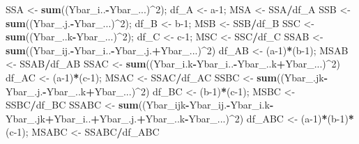 \documentclass[
]{book}
\newenvironment{Shaded}{\begin{snugshade}}{\end{snugshade}}
\newcommand{\DecValTok}[1]{\textcolor[rgb]{0.00,0.00,0.81}{#1}}
\newcommand{\FunctionTok}[1]{\textcolor[rgb]{0.13,0.29,0.53}{\textbf{#1}}}
\newcommand{\NormalTok}[1]{#1}
\newcommand{\OtherTok}[1]{\textcolor[rgb]{0.56,0.35,0.01}{#1}}
\newcommand{\SpecialCharTok}[1]{\textcolor[rgb]{0.81,0.36,0.00}{\textbf{#1}}}
\begin{document}
\begin{Shaded}
\begin{Highlighting}[]
\NormalTok{SSA }\OtherTok{\textless{}{-}} \FunctionTok{sum}\NormalTok{((Ybar\_i..}\SpecialCharTok{{-}}\NormalTok{Ybar\_...)}\SpecialCharTok{\^{}}\DecValTok{2}\NormalTok{); df\_A }\OtherTok{\textless{}{-}}\NormalTok{ a}\DecValTok{{-}1}\NormalTok{; MSA }\OtherTok{\textless{}{-}}\NormalTok{ SSA}\SpecialCharTok{/}\NormalTok{df\_A}
\NormalTok{SSB }\OtherTok{\textless{}{-}} \FunctionTok{sum}\NormalTok{((Ybar\_.j.}\SpecialCharTok{{-}}\NormalTok{Ybar\_...)}\SpecialCharTok{\^{}}\DecValTok{2}\NormalTok{); df\_B }\OtherTok{\textless{}{-}}\NormalTok{ b}\DecValTok{{-}1}\NormalTok{; MSB }\OtherTok{\textless{}{-}}\NormalTok{ SSB}\SpecialCharTok{/}\NormalTok{df\_B}
\NormalTok{SSC }\OtherTok{\textless{}{-}} \FunctionTok{sum}\NormalTok{((Ybar\_..k}\SpecialCharTok{{-}}\NormalTok{Ybar\_...)}\SpecialCharTok{\^{}}\DecValTok{2}\NormalTok{); df\_C }\OtherTok{\textless{}{-}}\NormalTok{ c}\DecValTok{{-}1}\NormalTok{; MSC }\OtherTok{\textless{}{-}}\NormalTok{ SSC}\SpecialCharTok{/}\NormalTok{df\_C}
\NormalTok{SSAB }\OtherTok{\textless{}{-}} \FunctionTok{sum}\NormalTok{((Ybar\_ij.}\SpecialCharTok{{-}}\NormalTok{Ybar\_i..}\SpecialCharTok{{-}}\NormalTok{Ybar\_.j.}\SpecialCharTok{+}\NormalTok{Ybar\_...)}\SpecialCharTok{\^{}}\DecValTok{2}\NormalTok{)}
\NormalTok{df\_AB }\OtherTok{\textless{}{-}}\NormalTok{ (a}\DecValTok{{-}1}\NormalTok{)}\SpecialCharTok{*}\NormalTok{(b}\DecValTok{{-}1}\NormalTok{); MSAB }\OtherTok{\textless{}{-}}\NormalTok{ SSAB}\SpecialCharTok{/}\NormalTok{df\_AB}
\NormalTok{SSAC }\OtherTok{\textless{}{-}} \FunctionTok{sum}\NormalTok{((Ybar\_i.k}\SpecialCharTok{{-}}\NormalTok{Ybar\_i..}\SpecialCharTok{{-}}\NormalTok{Ybar\_..k}\SpecialCharTok{+}\NormalTok{Ybar\_...)}\SpecialCharTok{\^{}}\DecValTok{2}\NormalTok{)}
\NormalTok{df\_AC }\OtherTok{\textless{}{-}}\NormalTok{ (a}\DecValTok{{-}1}\NormalTok{)}\SpecialCharTok{*}\NormalTok{(c}\DecValTok{{-}1}\NormalTok{); MSAC }\OtherTok{\textless{}{-}}\NormalTok{ SSAC}\SpecialCharTok{/}\NormalTok{df\_AC}
\NormalTok{SSBC }\OtherTok{\textless{}{-}} \FunctionTok{sum}\NormalTok{((Ybar\_.jk}\SpecialCharTok{{-}}\NormalTok{Ybar\_.j.}\SpecialCharTok{{-}}\NormalTok{Ybar\_..k}\SpecialCharTok{+}\NormalTok{Ybar\_...)}\SpecialCharTok{\^{}}\DecValTok{2}\NormalTok{)}
\NormalTok{df\_BC }\OtherTok{\textless{}{-}}\NormalTok{ (b}\DecValTok{{-}1}\NormalTok{)}\SpecialCharTok{*}\NormalTok{(c}\DecValTok{{-}1}\NormalTok{); MSBC }\OtherTok{\textless{}{-}}\NormalTok{ SSBC}\SpecialCharTok{/}\NormalTok{df\_BC}
\NormalTok{SSABC }\OtherTok{\textless{}{-}} \FunctionTok{sum}\NormalTok{((Ybar\_ijk}\SpecialCharTok{{-}}\NormalTok{Ybar\_ij.}\SpecialCharTok{{-}}\NormalTok{Ybar\_i.k}\SpecialCharTok{{-}}\NormalTok{Ybar\_.jk}\SpecialCharTok{+}\NormalTok{Ybar\_i..}\SpecialCharTok{+}\NormalTok{Ybar\_.j.}\SpecialCharTok{+}\NormalTok{Ybar\_..k}\SpecialCharTok{{-}}\NormalTok{Ybar\_...)}\SpecialCharTok{\^{}}\DecValTok{2}\NormalTok{)}
\NormalTok{df\_ABC }\OtherTok{\textless{}{-}}\NormalTok{ (a}\DecValTok{{-}1}\NormalTok{)}\SpecialCharTok{*}\NormalTok{(b}\DecValTok{{-}1}\NormalTok{)}\SpecialCharTok{*}\NormalTok{(c}\DecValTok{{-}1}\NormalTok{); MSABC }\OtherTok{\textless{}{-}}\NormalTok{ SSABC}\SpecialCharTok{/}\NormalTok{df\_ABC}


\end{Highlighting}
\end{Shaded}
\end{document}
